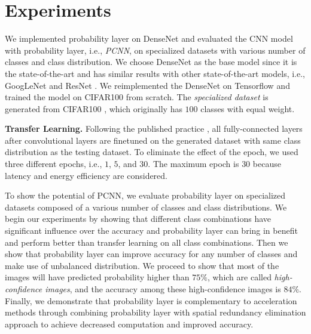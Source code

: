\documentclass{article}
\begin{document}
\section{Experiments}


We implemented probability layer on DenseNet \cite{huang2017densely} and evaluated the CNN model with probability layer, i.e., \textit{PCNN}, on specialized datasets with various number of classes and class distribution. We choose DenseNet as the base model since it is the state-of-the-art and has similar results with other state-of-the-art models, i.e., GoogLeNet \cite{szegedy2015going} and ResNet \cite{he2016deep}. We reimplemented the DenseNet on Tensorflow \cite{abadi2016tensorflow} and trained the model on CIFAR100 \cite{krizhevsky2009learning} from scratch. The \textit{specialized dataset} is generated from CIFAR100 \cite{krizhevsky2009learning}, which originally has $100$ classes with equal weight. 

\textbf{Transfer Learning.} Following the published practice \cite{doersch2015unsupervised, han2016mcdnn, oquab2014learning, shen2017fast, yosinski2014transferable}, all fully-connected layers after convolutional layers are finetuned on the generated dataset with same class distribution as the testing dataset. To eliminate the effect of the epoch, we used three different epochs, i.e., $1$, $5$, and $30$. The maximum epoch is $30$ because latency and energy efficiency are considered.

To show the potential of PCNN, we evaluate probability layer on specialized datasets composed of a various number of classes and class distributions. We begin our experiments by showing that different class combinations have significant influence over the accuracy and probability layer can bring in benefit and perform better than transfer learning on all class combinations. Then we show that probability layer can improve accuracy for any number of classes and make use of unbalanced distribution. We proceed to show that most of the images will have predicted probability higher than $75\%$, which are called \textit{high-confidence images}, and the accuracy among these high-confidence images is $84\%$. Finally, we demonstrate that probability layer is complementary to acceleration methods through combining probability layer with spatial redundancy elimination approach \cite{figurnov2016perforatedcnns} to achieve decreased computation and improved accuracy.
\end{document}
